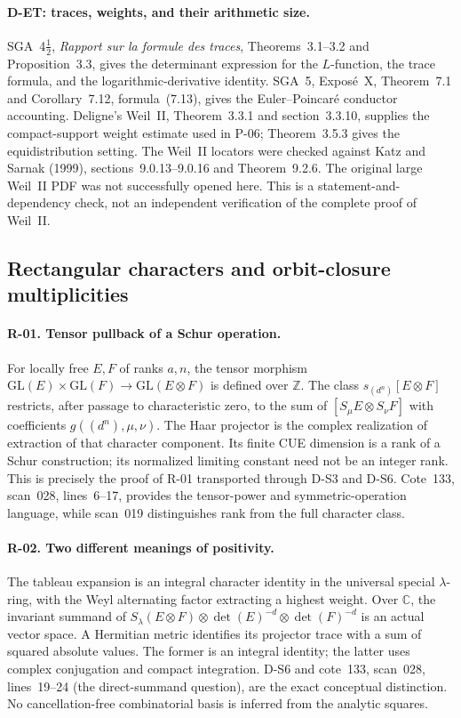 \paragraph{D-ET: traces, weights, and their arithmetic size.}
SGA~4$\frac12$, \emph{Rapport sur la formule des traces}, Theorems~3.1--3.2 and Proposition~3.3, gives the determinant expression for the $L$-function, the trace formula, and the logarithmic-derivative identity. SGA~5, Expos\'e~X, Theorem~7.1 and Corollary~7.12, formula~(7.13), gives the Euler--Poincar\'e conductor accounting. Deligne's Weil~II, Theorem~3.3.1 and section~3.3.10, supplies the compact-support weight estimate used in P-06; Theorem~3.5.3 gives the equidistribution setting. The Weil~II locators were checked against Katz and Sarnak (1999), sections~9.0.13--9.0.16 and Theorem~9.2.6. The original large Weil~II PDF was not successfully opened here. This is a statement-and-dependency check, not an independent verification of the complete proof of Weil~II.

\subsection{Rectangular characters and orbit-closure multiplicities}

\paragraph{R-01. Tensor pullback of a Schur operation.}
For locally free $E,F$ of ranks $a,n$, the tensor morphism $\mathrm{GL}(E)\times\mathrm{GL}(F)\to\mathrm{GL}(E\otimes F)$ is defined over $\mathbb Z$. The class $s_{(d^n)}[E\otimes F]$ restricts, after passage to characteristic zero, to the sum of $[S_\mu E\otimes S_\nu F]$ with coefficients $g((d^n),\mu,\nu)$. The Haar projector is the complex realization of extraction of that character component. Its finite CUE dimension is a rank of a Schur construction; its normalized limiting constant need not be an integer rank. This is precisely the proof of R-01 transported through D-S3 and D-S6. Cote~133, scan~028, lines~6--17, provides the tensor-power and symmetric-operation language, while scan~019 distinguishes rank from the full character class.

\paragraph{R-02. Two different meanings of positivity.}
The tableau expansion is an integral character identity in the universal special $\lambda$-ring, with the Weyl alternating factor extracting a highest weight. Over $\mathbb C$, the invariant summand of $S_\lambda(E\otimes F)\otimes\det(E)^{-d}\otimes\det(F)^{-d}$ is an actual vector space. A Hermitian metric identifies its projector trace with a sum of squared absolute values. The former is an integral identity; the latter uses complex conjugation and compact integration. D-S6 and cote~133, scan~028, lines~19--24 (the direct-summand question), are the exact conceptual distinction. No cancellation-free combinatorial basis is inferred from the analytic squares.

